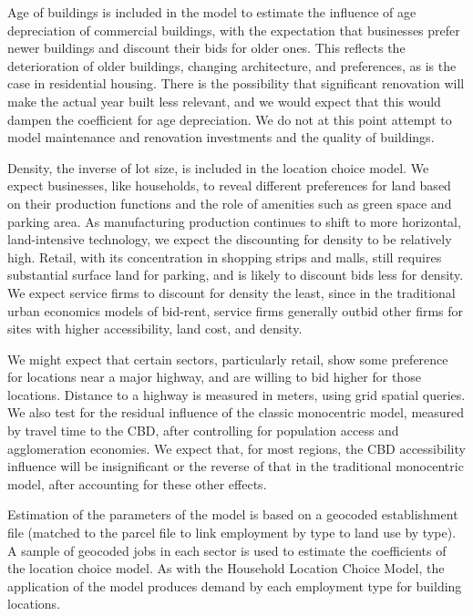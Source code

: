 Age of buildings is included in the model to estimate the
influence of age depreciation of commercial buildings, with the
expectation that businesses prefer newer buildings and discount
their bids for older ones.  This reflects the deterioration of
older buildings, changing architecture, and preferences, as is the
case in residential housing.  There is the possibility that
significant renovation will make the actual year built less
relevant, and we would expect that this would dampen the
coefficient for age depreciation.  We do not at this point attempt
to model maintenance and renovation investments and the quality of
buildings.

Density, the inverse of lot size, is included in the location
choice model.  We expect businesses, like households, to reveal
different preferences for land based on their production functions
and the role of amenities such as green space and parking area. As
manufacturing production continues to shift to more horizontal,
land-intensive technology, we expect the discounting for density
to be relatively high.  Retail, with its concentration in shopping
strips and malls, still requires substantial surface land for
parking, and is likely to discount bids less for density.  We
expect service firms to discount for density the least, since in
the traditional urban economics models of bid-rent, service firms
generally outbid other firms for sites with higher accessibility,
land cost, and density.

We might expect that certain sectors, particularly retail, show
some preference for locations near a major highway, and are
willing to bid higher for those locations.  Distance to a highway
is measured in meters, using grid spatial queries.  We also test
for the residual influence of the classic monocentric model,
measured by travel time to the CBD, after controlling for
population access and agglomeration economies.  We expect that,
for most regions, the CBD accessibility influence will be
insignificant or the reverse of that in the traditional
monocentric model, after accounting for these other effects.

Estimation of the parameters of the model is based on a geocoded establishment file
(matched to the parcel file to link employment by type to land use
by type).  A sample of geocoded jobs in each sector is used to
estimate the coefficients of the location choice model.  As with
the Household Location Choice Model, the application of the model
produces demand by each employment type for building locations.

